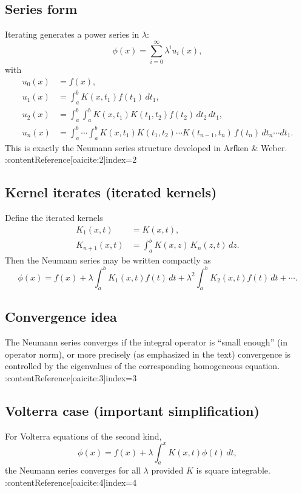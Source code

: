 \subsection{Series form}
Iterating generates a power series in $\lambda$:
\begin{equation}
\phi(x) = \sum_{i=0}^{\infty} \lambda^i u_i(x),
\end{equation}
with
\begin{align}
u_0(x) &= f(x),\\
u_1(x) &= \int_a^b K(x,t_1)f(t_1)\,dt_1,\\
u_2(x) &= \int_a^b\!\!\int_a^b K(x,t_1)K(t_1,t_2)f(t_2)\,dt_2\,dt_1,\\
u_n(x) &= \int_a^b\cdots\int_a^b
K(x,t_1)K(t_1,t_2)\cdots K(t_{n-1},t_n)\,f(t_n)\,dt_n\cdots dt_1.
\end{align}
This is exactly the Neumann series structure developed in Arfken \& Weber. :contentReference[oaicite:2]{index=2}

\subsection{Kernel iterates (iterated kernels)}
Define the iterated kernels
\begin{align}
K_1(x,t) &= K(x,t),\\
K_{n+1}(x,t) &= \int_a^b K(x,z)\,K_n(z,t)\,dz.
\end{align}
Then the Neumann series may be written compactly as
\begin{equation}
\phi(x)=f(x)+\lambda\int_a^b K_1(x,t)f(t)\,dt
+\lambda^2\int_a^b K_2(x,t)f(t)\,dt+\cdots.
\end{equation}

\subsection{Convergence idea}
The Neumann series converges if the integral operator is ``small enough'' (in operator norm),
or more precisely (as emphasized in the text) convergence is controlled by the eigenvalues
of the corresponding homogeneous equation. :contentReference[oaicite:3]{index=3}

\subsection{Volterra case (important simplification)}
For Volterra equations of the second kind,
\begin{equation}
\phi(x)=f(x)+\lambda\int_a^x K(x,t)\phi(t)\,dt,
\end{equation}
the Neumann series converges for all $\lambda$ provided $K$ is square integrable. :contentReference[oaicite:4]{index=4}

